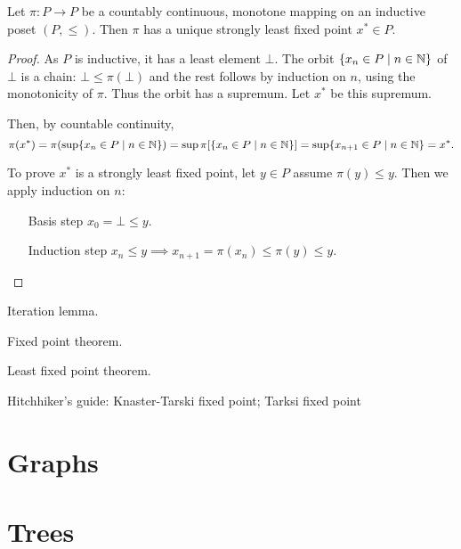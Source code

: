 \begin{theorem}
Let $\pi:P\to P$ be a countably continuous, monotone mapping on an inductive poset $(P,\leq)$. Then $\pi$ has a unique strongly least fixed point $x^*\in P$.
\end{theorem}
\begin{proof}
As $P$ is inductive, it has a least element $\bot$. The orbit $\{x_n\in P\;|\; n\in \mathbb{N}\}$ of $\bot$ is a chain: $\bot \leq \pi(\bot)$ and the rest follows by induction on $n$, using the monotonicity of $\pi$. Thus the orbit has a supremum. Let $x^*$ be this supremum.

Then, by countable continuity,
\[ \pi(x^*) = \pi(\sup\{x_n\in P\;|\; n\in \mathbb{N}\}) = \sup\pi[\{x_n\in P\;|\; n\in \mathbb{N}\}] = \sup\{x_{n+1}\in P\;|\; n\in \mathbb{N}\} = x^*. \]

To prove $x^*$ is a strongly least fixed point, let $y\in P$ assume $\pi(y)\leq y$. Then we apply induction on $n$:
\begin{itemize}[leftmargin=3cm]
\item[Basis step] $x_0 = \bot \leq y$.
\item[Induction step] $x_n \leq y \implies x_{n+1} = \pi(x_n)\leq \pi(y) \leq y$.
\end{itemize}
\end{proof}

Iteration lemma.

Fixed point theorem.

Least fixed point theorem.

Hitchhiker's guide:
Knaster-Tarski fixed point; Tarksi fixed point

\chapter{Graphs}
\chapter{Trees}
